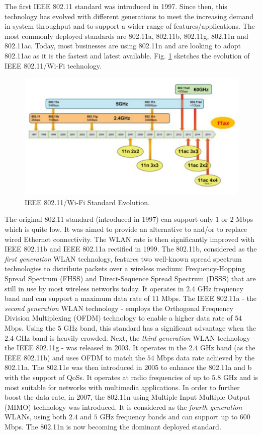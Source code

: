 The first IEEE 802.11 standard was introduced in 1997. Since then, this technology has evolved with different generations to meet the increasing demand in system throughput and to support a wider range of features/applications. The most commonly deployed standards are 802.11a, 802.11b, 802.11g, 802.11n and 802.11ac. Today, most businesses are using 802.11n and are looking to adopt 802.11ac as it is the fastest and latest available. Fig. \ref{figs:Wi-Fi-evolution} sketches the evolution of IEEE 802.11/Wi-Fi technology.

\begin{figure}[!t]
	\centering
	\includegraphics[width=1.0\columnwidth]{figures2/Wi-Fi-evolution.pdf}
	\caption{IEEE 802.11/Wi-Fi Standard Evolution.}
	\label{figs:Wi-Fi-evolution}
\end{figure}

The original 802.11 standard (introduced in 1997) can support only $1$ or $2$ Mbps which is quite low. It was aimed to provide an alternative to and/or to replace wired Ethernet connectivity. The WLAN rate is then significantly improved with IEEE 802.11b and IEEE 802.11a rectified in 1999. The 802.11b, considered as the \textit{first generation} WLAN technology, features two well-known spread spectrum technologies to distribute packets over a wireless medium: Frequency-Hopping Spread Spectrum (FHSS) and Direct-Sequence Spread Spectrum (DSSS) that are still in use by most wireless networks today. It operates in $2.4$ GHz frequency band and can support a maximum data rate of $11$ Mbps. The IEEE 802.11a - the \textit{second generation} WLAN technology - employs the Orthogonal Frequency Division Multiplexing (OFDM) technology to enable a higher data rate of $54$ Mbps. Using the $5$ GHz band, this standard has a significant advantage when the $2.4$ GHz band is heavily crowded. Next, the \textit{third generation }WLAN technology - the IEEE 802.11g - was released in 2003. It operates in the $2.4$ GHz band (as the IEEE 802.11b) and uses OFDM to match the $54$ Mbps data rate achieved by the 802.11a. The 802.11e was then introduced in 2005 to enhance the 802.11a and b with the support of QoSs. It operates at radio frequencies of up to $5.8$ GHz and is most suitable for networks with multimedia applications. In order to further boost the data rate, in 2007, the 802.11n using Multiple Input Multiple Output (MIMO) technology was introduced. It is considered as the \textit{fourth generation} WLANs, using both $2.4$ and $5$ GHz frequency bands and can support up to $600$ Mbps. The 802.11n is now becoming the dominant deployed standard.

